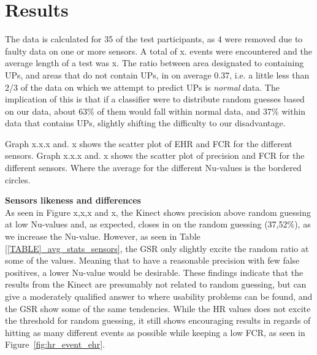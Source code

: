 \section{Results}
The data is calculated for 35 of the test participants, as 4 were removed due to faulty data on one or more sensors.	
A total of x. events were encountered and the average length of a test was x.
The ratio between area designated to containing UPs, and areas that do not contain UPs, in on average 0.37, i.e. a
little less than 2/3 of the data on which we attempt to predict UPs is \textit{normal} data. The implication of this is
that if a classifier were to distribute random guesses based on our data, about 63\% of them would fall within normal
data, and 37\% within data that contains UPs, slightly shifting the difficulty to our disadvantage.

Graph x.x.x and. x shows the scatter plot of EHR and FCR for the different sensors. 
Graph x.x.x and. x shows the scatter plot of precision and FCR for the different sensors. Where the average for the different Nu-values is the bordered circles.



\textbf{Sensors likeness and differences}\\



As seen in Figure x,x,x and x, the Kinect shows precision above random guessing at low Nu-values and,
as expected, closes in on the random guessing (37,52\%), as we increase the Nu-value. However, as seen in Table
\ref{[TABLE]_avg_stats_sensors}, the GSR only slightly excite the random ratio at some of the values. Meaning that
to have a reasonable precision with few false positives, a lower Nu-value would be desirable.
These findings indicate that the results from the Kinect are presumably not related to random guessing, but can give a moderately qualified answer to where usability problems can be found, and the GSR show some of the same tendencies.
While the HR values does not excite the threshold for random guessing, it still shows encouraging results in regards of hitting as many different events as possible while keeping a low FCR, as seen in Figure~\ref{fig:hr_event_ehr}.




